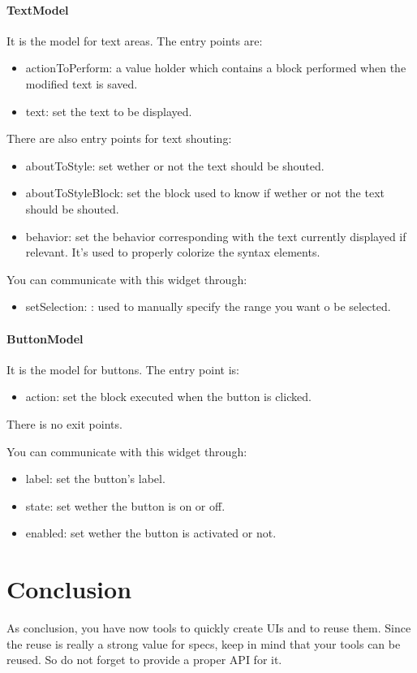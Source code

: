 \documentclass[a4paper,10pt,twoside]{book}
\begin{document}
\paragraph{TextModel} It is the model for text areas.
The entry points are:
\begin{itemize}
	\item actionToPerform: a value holder which contains a block performed when the modified text is saved.
	\item text: set the text to be displayed.
\end{itemize}
There are also entry points for text shouting:
\begin{itemize}	
	\item aboutToStyle: set wether or not the text should be shouted.
	\item aboutToStyleBlock: set the block used to know if wether or not the text should be shouted.
	\item behavior: set the behavior corresponding with the text currently displayed if relevant. It's used to properly colorize the syntax elements.
\end{itemize}	
You can communicate with this widget through:
\begin{itemize}	
	\item setSelection: : used to manually specify the range you want o be selected.
\end{itemize}

\paragraph{ButtonModel} It is the model for buttons.
The entry point is:
\begin{itemize}
	\item action: set the block executed when the button is clicked.
\end{itemize}	
There is no exit points.	

You can communicate with this widget through:
\begin{itemize}		
	\item label: set the button's label.
	\item state: set wether the button is on or off.
	\item enabled: set wether the button is activated or not.
\end{itemize}

\section{Conclusion}
As conclusion, you have now tools to quickly create UIs and to reuse them. Since the reuse is really a strong value for specs, keep in mind that your tools can be reused. So do not forget to provide a proper API for it.

\ifx\wholebook\relax\else
   
   
\end{document}
